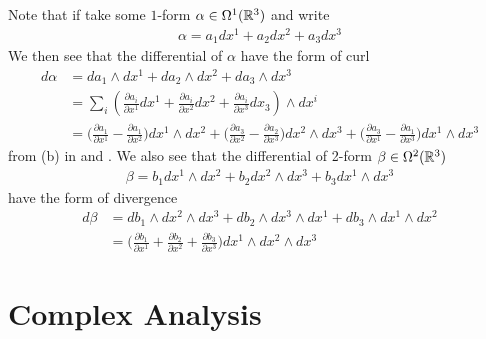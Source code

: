\documentclass{report}
\begin{document}
\begin{mdframed}
Note that if take some $1$-form  $\alpha \in \Omega^1(\mathbb{R}^3)$ and write 
\begin{align*}
\alpha =a_1dx^1 + a_2dx^2+a_3dx^3
\end{align*}
We then see that the differential of $\alpha $ have the form of curl 
\begin{align*}
d\alpha &= da_1 \wedge  dx^1 + da_2\wedge  dx^2 +da_3\wedge   dx^3   \\
&=  \sum_i (\frac{\partial a_i}{\partial x^1}dx^1+\frac{\partial a_i}{\partial x^2}dx^2+ \frac{\partial a_i}{\partial x^3}dx_3)\wedge  dx^i \\
&=\Big(\frac{\partial a_1}{\partial x^1}-\frac{\partial a_1}{\partial x^2}\Big) dx^1 \wedge  dx^2 + \Big( \frac{\partial a_3}{\partial x^2}- \frac{\partial a_2}{\partial x^3} \Big)dx^2 \wedge  dx^3+ \Big( \frac{\partial a_3}{\partial x^1}- \frac{\partial a_1}{\partial x^3} \Big) dx^1\wedge  dx^3 
\end{align*}
from (b) in  and . We also see that the differential of 2-form $\beta \in \Omega^2(\mathbb{R}^3)$ 
\begin{align*}
\beta =b_1 dx^1 \wedge  dx^2 + b_2 dx^2\wedge  dx^3 + b_3 dx^1 \wedge  dx^3   
\end{align*}
have the form of divergence
\begin{align*}
d\beta  &=db_1 \wedge  dx^2\wedge  dx^3+ db_2 \wedge  dx^3 \wedge  dx^1 + db_3 \wedge  dx^1\wedge  dx^2      \\
&= \Big( \frac{\partial b_1}{\partial x^1} + \frac{\partial b_2}{\partial x^2}+ \frac{\partial b_3}{\partial x^3} \Big) dx^1 \wedge  dx^2 \wedge  dx^3  
\end{align*}
\end{mdframed}

\chapter{Complex Analysis}
\end{document}
